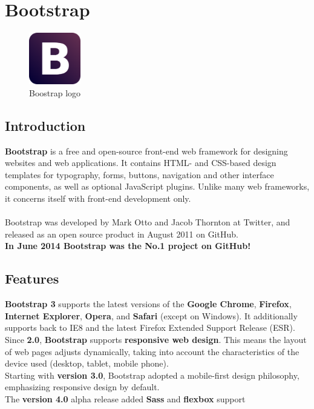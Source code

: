 \documentclass[12pt]{article}
\begin{document}
	\vspace{38mm}
	
	\section{Bootstrap}
	\begin{figure}[h]
		\centering
		\includegraphics[width=0.20\textwidth]{Boostrap_logo.png}
		\caption{Boostrap logo}
	\end{figure}
	\subsection{Introduction}
	\textbf{Bootstrap} is a free and open-source front-end web framework for designing websites and web applications. It contains HTML- and CSS-based design templates for typography, forms, buttons, navigation and other interface components, as well as optional JavaScript plugins. Unlike many web frameworks, it concerns itself with front-end development only.
	\\
	\\
	Bootstrap was developed by Mark Otto and Jacob Thornton at Twitter, and released as an open source product in August 2011 on GitHub.\\
	\textbf{In June 2014 Bootstrap was the No.1 project on GitHub!}
	\subsection{Features}
	\textbf{Bootstrap 3} supports the latest versions of the \textbf{Google Chrome}, \textbf{Firefox}, \textbf{Internet Explorer}, \textbf{Opera}, and \textbf{Safari} (except on Windows). It additionally supports back to IE8 and the latest Firefox Extended Support Release (ESR).
	\\
	Since \textbf{2.0}, \textbf{Bootstrap} supports \textbf{responsive web design}. This means the layout of web pages adjusts dynamically, taking into account the characteristics of the device used (desktop, tablet, mobile phone).
	\\
	Starting with \textbf{version 3.0}, Bootstrap adopted a mobile-first design philosophy, emphasizing responsive design by default.
	\\
	The \textbf{version 4.0} alpha release added \textbf{Sass} and \textbf{flexbox} support
\end{document}
